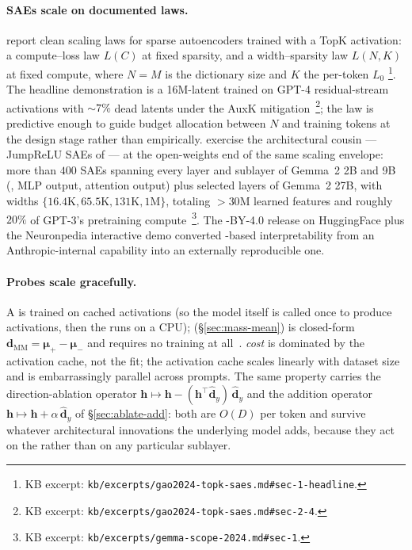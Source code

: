 \paragraph{SAEs scale on documented laws.}
\citet{gao2024-topk-saes} report clean scaling laws for sparse
autoencoders trained with a TopK activation: a compute--loss law
$L(C)$ at fixed sparsity, and a width--sparsity law $L(N, K)$ at fixed
compute, where $N = M$ is the dictionary size and $K$ the per-token
$L_0$ \citep[\S 1, \S 3]{gao2024-topk-saes}\footnote{KB excerpt:
\texttt{kb/excerpts/gao2024-topk-saes.md\#sec-1-headline}.}. The headline
demonstration is a 16M-latent  trained on GPT-4 residual-stream
activations with $\sim 7\%$ dead latents under the AuxK
mitigation~\citep[\S 2.4]{gao2024-topk-saes}\footnote{KB excerpt:
\texttt{kb/excerpts/gao2024-topk-saes.md\#sec-2-4}.}; the law is
predictive enough to guide budget allocation between $N$ and training
tokens at the design stage rather than empirically. \citet{gemma-scope-2024}
exercise the architectural cousin --- JumpReLU SAEs of
\citet{rajamanoharan2024-jumprelu} --- at the open-weights end of the
same scaling envelope: more than $400$ SAEs spanning every layer and
sublayer of Gemma~2 2B and 9B (, MLP output, attention
output) plus selected layers of Gemma~2 27B, with widths
$\{16.4\text{K}, 65.5\text{K}, 131\text{K}, 1\text{M}\}$, totaling
$>\!30$M learned features and roughly $20\%$ of GPT-3's pretraining
compute~\citep[\S 1]{gemma-scope-2024}\footnote{KB excerpt:
\texttt{kb/excerpts/gemma-scope-2024.md\#sec-1}.}. The -BY-4.0 release
on HuggingFace plus the Neuronpedia interactive demo
 converted -based interpretability from an
Anthropic-internal capability into an externally reproducible one.

\paragraph{Probes scale gracefully.}
A  is trained on cached activations (so the model itself is
called once to produce activations, then the  runs on a CPU);
 (\S\ref{sec:mass-mean}) is closed-form
$\mathbf{d}_{\mathrm{MM}} = \boldsymbol{\mu}_+ - \boldsymbol{\mu}_-$ and
requires no training at all~\citep{marks-tegmark-2023-truth}. 
\emph{cost} is dominated by the activation cache, not the  fit;
the activation cache scales linearly with dataset size and is
embarrassingly parallel across prompts. The same property carries the
direction-ablation operator
$\mathbf{h} \mapsto \mathbf{h} - (\mathbf{h}^\top \hat{\mathbf{d}}_y)\,\hat{\mathbf{d}}_y$
and the addition operator $\mathbf{h} \mapsto \mathbf{h} + \alpha\,
\hat{\mathbf{d}}_y$ of \S\ref{sec:ablate-add}: both are $O(D)$ per token
and survive whatever architectural innovations the underlying model
adds, because they act on the  rather than on any
particular sublayer.

